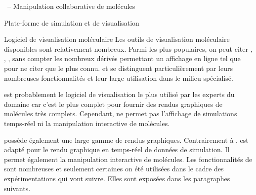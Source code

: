 \documentclass[myfrancais]{mythesis}
\begin{document}
\begin{mychapter}{\myShaddock\ -- Manipulation collaborative de molécules}
\begin{mysection}{Plate-forme de simulation et de visualisation}
			\begin{mysubsection}{Logiciel de visualisation moléculaire}
				Les outils de visualisation moléculaire disponibles sont relativement nombreux.
				Parmi les plus populaires, on peut citer \myPyMOL {},  , \myChimera {}, \myRasmol {} sans compter les nombreux dérivés permettant un affichage en ligne tel que \myJmol {} pour ne citer que le plus connu.
				\myPyMOL et  se distinguent particulièrement par leurs nombreuses fonctionnalités et leur large utilisation dans le milieu spécialisé.

				\myPyMOL est probablement le logiciel de visualisation le plus utilisé par les experts du domaine car c'est le plus complet pour fournir des rendus graphiques de molécules très complets.
				Cependant, \myPyMOL ne permet pas l'affichage de simulations temps-réel ni la manipulation interactive de molécules.

				 possède également une large gamme de rendus graphiques.
				Contrairement à \myPyMOL,  est adapté pour le rendu graphique en temps-réel de données de simulation.
				Il permet également la manipulation interactive de molécules.
				Les fonctionnalités de  sont nombreuses et seulement certaines on été utilisées dans le cadre des expérimentations qui vont suivre.
				Elles sont exposées dans les paragraphes suivants.


\end{mysubsection}
\end{mysection}
\end{mychapter}
\end{document}
